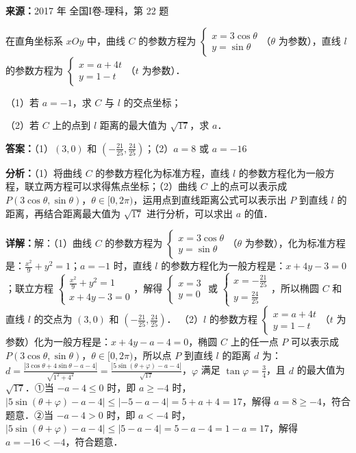 \begin{question}[points=10]
\textbf{来源：}2017 年 全国I卷-理科，第 22 题\par
[选修 4-4，坐标系与参数方程]

在直角坐标系 $xOy$ 中，曲线 $C$ 的参数方程为 $\begin{cases} x=3\cos\theta \\ y=\sin\theta \end{cases}$（$\theta$ 为参数），直线 $l$ 的参数方程为 $\begin{cases} x=a+4t \\ y=1-t \end{cases}$（$t$ 为参数）．

（1）若 $a=-1$，求 $C$ 与 $l$ 的交点坐标；

（2）若 $C$ 上的点到 $l$ 距离的最大值为 $\sqrt{17}$，求 $a$．
\begin{solution}
\textbf{答案：}（1）$(3,0)$ 和 $(-\frac{21}{25},\frac{24}{25})$；（2）$a=8$ 或 $a=-16$

\textbf{分析：}（1）将曲线 $C$ 的参数方程化为标准方程，直线 $l$ 的参数方程化为一般方程，联立两方程可以求得焦点坐标；（2）曲线 $C$ 上的点可以表示成 $P(3\cos\theta,\sin\theta)$，$\theta\in[0,2\pi)$，运用点到直线距离公式可以表示出 $P$ 到直线 $l$ 的距离，再结合距离最大值为 $\sqrt{17}$ 进行分析，可以求出 $a$ 的值．

\textbf{详解：}解：（1）曲线 $C$ 的参数方程为 $\begin{cases} x=3\cos\theta \\ y=\sin\theta \end{cases}$（$\theta$ 为参数），化为标准方程是：$\frac{x^2}{9}+y^2=1$；$a=-1$ 时，直线 $l$ 的参数方程化为一般方程是：$x+4y-3=0$；联立方程 $\begin{cases} \frac{x^2}{9}+y^2=1 \\ x+4y-3=0 \end{cases}$，解得 $\begin{cases} x=3 \\ y=0 \end{cases}$ 或 $\begin{cases} x=-\frac{21}{25} \\ y=\frac{24}{25} \end{cases}$，所以椭圆 $C$ 和直线 $l$ 的交点为 $(3,0)$ 和 $(-\frac{21}{25},\frac{24}{25})$．
（2）$l$ 的参数方程 $\begin{cases} x=a+4t \\ y=1-t \end{cases}$（$t$ 为参数）化为一般方程是：$x+4y-a-4=0$，椭圆 $C$ 上的任一点 $P$ 可以表示成 $P(3\cos\theta,\sin\theta)$，$\theta\in[0,2\pi)$，所以点 $P$ 到直线 $l$ 的距离 $d$ 为：$d=\frac{|3\cos\theta+4\sin\theta-a-4|}{\sqrt{1^2+4^2}}=\frac{|5\sin(\theta+\varphi)-a-4|}{\sqrt{17}}$，$\varphi$ 满足 $\tan\varphi=\frac{3}{4}$，且 $d$ 的最大值为 $\sqrt{17}$．①当 $-a-4\leq0$ 时，即 $a\geq-4$ 时，$|5\sin(\theta+\varphi)-a-4|\leq| -5-a-4|=5+a+4=17$，解得 $a=8\geq-4$，符合题意．②当 $-a-4>0$ 时，即 $a<-4$ 时，$|5\sin(\theta+\varphi)-a-4|\leq|5-a-4|=5-a-4=1-a=17$，解得 $a=-16<-4$，符合题意．
\end{solution}
\end{question}

